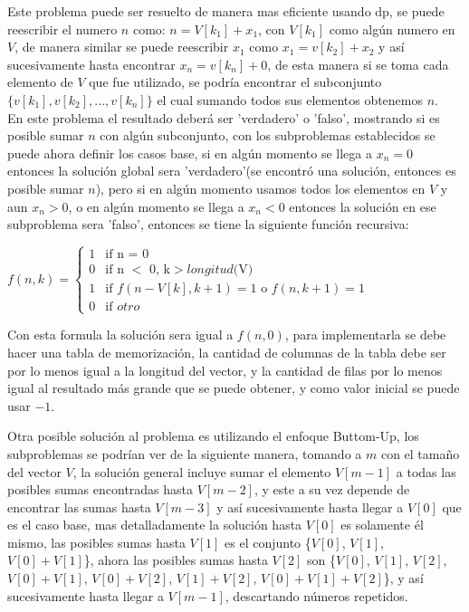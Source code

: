 \documentclass[12pt, a4paper]{article}
\newcommand\cppfile[2][]{

}
\begin{document}
	Este problema puede ser resuelto de manera mas eficiente usando dp, se puede
	reescribir el numero $n$ como: $n=V[k_{1}]+x_{1}$, con $V[k_{1}]$ como algún numero en $V$, de manera similar se
	puede reescribir $x_{1}$ como $x_{1}=v[k_{2}]+x_{2}$ y así sucesivamente hasta encontrar $x_{n}=v[k_{n}]+0$, de 
	esta manera si se toma cada elemento de $V$ que fue utilizado, se podría encontrar el subconjunto 
	$\{v[k_{1}],v[k_{2}],...,v[k_{n}]\}$ el cual sumando todos sus elementos obtenemos $n$.\\
	
	En este problema el resultado deberá ser 'verdadero' o 'falso', mostrando si es posible sumar $n$ con algún 
	subconjunto, con los subproblemas establecidos se puede ahora definir los casos base, si en algún momento 
	se llega a $x_{n}=0$ entonces la solución global sera 'verdadero'(se encontró una solución, entonces es posible 
	sumar $n$), pero si en algún momento usamos todos los elementos en $V$ y aun $x_{n}>0$, o 
	en algún momento se llega a $x_{n}<0$ entonces la solución en ese subproblema sera 'falso', entonces se tiene la
	siguiente función recursiva:
	\begin{center}
		$f(n, k) = 	
		\begin{cases}
			1 & \text{if n = 0}\\
			0 & \text{if n $<$ 0, k$>longitud($V$)$}\\
			1 & \text{if $f(n-V[k],k+1)=1$ o $f(n,k+1)=1$}\\
			0 & \text{if $otro$}
		\end{cases}
		$\\
	\end{center}
	Con esta formula la solución sera igual a $f(n,0)$, para implementarla se debe hacer una tabla de memorización,
	la cantidad de columnas de la tabla debe ser por lo menos igual a la longitud del vector, y la cantidad 
	de filas por lo menos igual al resultado más grande que se puede obtener, y como valor inicial se puede usar $-1$.
	\cppfile[24-33]{Programacion_dinamica/codigos/SubSetSum.cpp}
	
	Otra posible solución al problema es utilizando el enfoque Buttom-Up, los subproblemas se podrían ver de la  
	siguiente manera, tomando a $m$ con el tamaño del vector $V$, la solución general incluye sumar el
	elemento $V[m-1]$ a todas las posibles sumas encontradas hasta $V[m-2]$, y este a su vez depende de encontrar las
	sumas hasta $V[m-3]$ y así sucesivamente hasta llegar a $V[0]$ que es el caso base, mas detalladamente la  
	solución hasta $V[0]$ es solamente él mismo, las posibles sumas hasta $V[1]$ es el conjunto 
	\{$V[0]$, $V[1]$, $V[0]+V[1]$\}, ahora las posibles sumas hasta $V[2]$ son 
	\{$V[0]$, $V[1]$, $V[2]$, $V[0]+V[1]$, $V[0]+V[2]$, $V[1]+V[2]$, $V[0]+V[1]+V[2]$\}, y así sucesivamente hasta  
	llegar a $V[m-1]$, descartando números repetidos.\\
	
\end{document}
